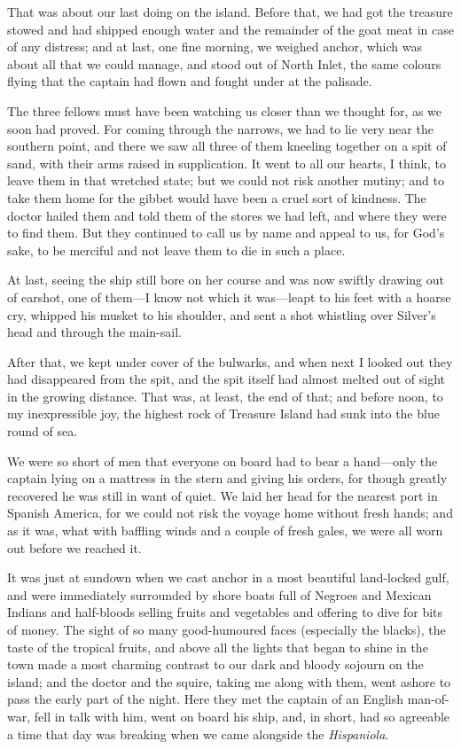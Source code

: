 That was about our last doing on the island. Before that, we had got the treasure stowed and had shipped enough water and the remainder of the goat meat in case of any distress; and at last, one fine morning, we weighed anchor, which was about all that we could manage, and stood out of North Inlet, the same colours flying that the captain had flown and fought under at the palisade.

The three fellows must have been watching us closer than we thought for, as we soon had proved. For coming through the narrows, we had to lie very near the southern point, and there we saw all three of them kneeling together on a spit of sand, with their arms raised in supplication. It went to all our hearts, I think, to leave them in that wretched state; but we could not risk another mutiny; and to take them home for the gibbet would have been a cruel sort of kindness. The doctor hailed them and told them of the stores we had left, and where they were to find them. But they continued to call us by name and appeal to us, for God's sake, to be merciful and not leave them to die in such a place.

At last, seeing the ship still bore on her course and was now swiftly drawing out of earshot, one of them—I know not which it was—leapt to his feet with a hoarse cry, whipped his musket to his shoulder, and sent a shot whistling over Silver's head and through the main-sail.

After that, we kept under cover of the bulwarks, and when next I looked out they had disappeared from the spit, and the spit itself had almost melted out of sight in the growing distance. That was, at least, the end of that; and before noon, to my inexpressible joy, the highest rock of Treasure Island had sunk into the blue round of sea.

We were so short of men that everyone on board had to bear a hand—only the captain lying on a mattress in the stern and giving his orders, for though greatly recovered he was still in want of quiet. We laid her head for the nearest port in Spanish America, for we could not risk the voyage home without fresh hands; and as it was, what with baffling winds and a couple of fresh gales, we were all worn out before we reached it.

It was just at sundown when we cast anchor in a most beautiful land-locked gulf, and were immediately surrounded by shore boats full of Negroes and Mexican Indians and half-bloods selling fruits and vegetables and offering to dive for bits of money. The sight of so many good-humoured faces (especially the blacks), the taste of the tropical fruits, and above all the lights that began to shine in the town made a most charming contrast to our dark and bloody sojourn on the island; and the doctor and the squire, taking me along with them, went ashore to pass the early part of the night. Here they met the captain of an English man-of-war, fell in talk with him, went on board his ship, and, in short, had so agreeable a time that day was breaking when we came alongside the \textit{Hispaniola}.

